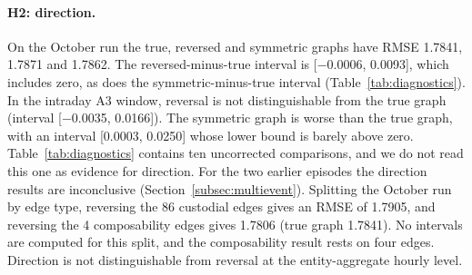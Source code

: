 \documentclass[referee,pdflatex,sn-mathphys-ay]{sn-jnl}
\theoremstyle{thmstyleone}%
\theoremstyle{thmstyletwo}%
\theoremstyle{thmstylethree}%
\begin{document}
\paragraph{H2: direction.} On the October run the true, reversed and symmetric graphs have RMSE 1.7841, 1.7871 and
1.7862. The reversed-minus-true interval is [$-$0.0006, 0.0093], which includes zero, as does the symmetric-minus-true
interval (Table~\ref{tab:diagnostics}). In the intraday A3 window, reversal is not distinguishable from the true graph
(interval [$-$0.0035, 0.0166]). The symmetric graph is worse than the true graph, with an interval [0.0003, 0.0250]
whose lower bound is barely above zero. Table~\ref{tab:diagnostics} contains ten uncorrected comparisons, and we do not read this one as evidence for
direction. For the two earlier episodes the direction results are inconclusive (Section~\ref{subsec:multievent}).
Splitting the October run by edge type, reversing the 86 custodial edges gives an RMSE of 1.7905, and reversing the
4 composability edges gives 1.7806 (true graph 1.7841). No intervals are computed for this split, and the
composability result rests on four edges. Direction is not distinguishable from reversal at the entity-aggregate hourly level.
\end{document}
